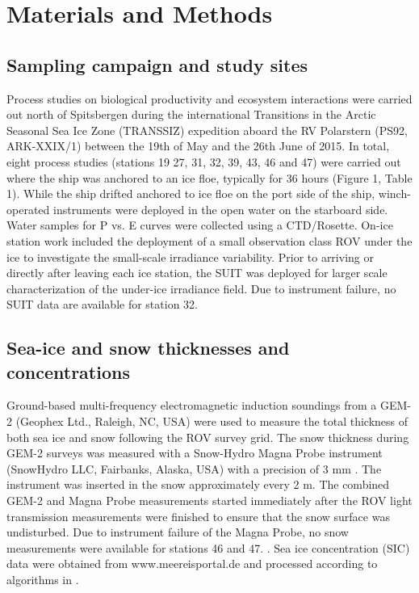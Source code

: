 \section{Materials and Methods}

\subsection{Sampling campaign and study sites}

Process studies on biological productivity and ecosystem interactions were carried out north of Spitsbergen during the international Transitions in the Arctic Seasonal Sea Ice Zone (TRANSSIZ) expedition aboard the RV Polarstern (PS92, ARK-XXIX/1) between the 19th of May and the 26th June of 2015. In total, eight process studies (stations 19 27, 31, 32, 39, 43, 46 and 47) were carried out where the ship was anchored to an ice floe, typically for 36 hours (Figure 1, Table 1). While the ship drifted anchored to ice floe on the port side of the ship, winch-operated instruments were deployed in the open water on the starboard side. Water samples for P vs. E curves were collected using a CTD/Rosette. On-ice station work included the deployment of a small observation class ROV under the ice to investigate the small-scale irradiance variability. Prior to arriving or directly after leaving each ice station, the SUIT was deployed for larger scale characterization of the under-ice irradiance field. Due to instrument failure, no SUIT data are available for station 32.

\subsection{Sea-ice and snow thicknesses and \DIFaddbegin {}\DIFaddend concentrations}

Ground-based multi-frequency electromagnetic induction soundings from a GEM-2 (Geophex Ltd., Raleigh, NC, USA) were used to measure the total thickness of both sea ice and snow following the ROV survey grid. The snow thickness during GEM-2 surveys was measured with a Snow-Hydro Magna Probe instrument (SnowHydro LLC, Fairbanks, Alaska, USA) with a precision of 3 mm \citep{Sturm2006}. The instrument was inserted in the snow approximately every 2 m. The combined GEM-2 and Magna Probe measurements started immediately after the ROV light transmission measurements were finished to ensure that the snow surface was undisturbed. \DIFaddbegin {}\DIFaddend Due to instrument failure of the Magna Probe, no snow measurements were available for stations 46 and 47. \DIFdelbegin {}\DIFdelend \DIFaddbegin {}\DIFaddend . Sea ice concentration (SIC) data were obtained from www.meereisportal.de and processed according to algorithms in \citet{Spreen2008}.


